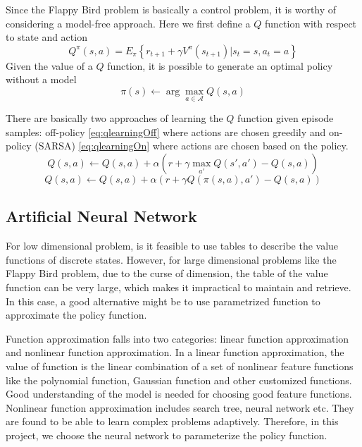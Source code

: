 \documentclass[conference,compsoc]{IEEEtran}
\begin{document}
Since the Flappy Bird problem is basically a control problem, it is worthy of considering a model-free approach. Here we first define a $Q$ function with respect to state and action 
\begin{equation}
Q^{\pi} (s,a) = E_{\pi} \left\{ r_{t+1} +\gamma V^{\pi}(s_{t+1}) | s_t =s, a_t=a\right\}
\end{equation}
Given the value of a $Q$ function, it is possible to generate an optimal policy without a model
\begin{equation}
\pi(s) \leftarrow \arg \max_{a\in \mathcal{A}} Q(s,a)
\end{equation}

There are basically two approaches of learning the $Q$ function given episode samples: off-policy \eqref{eq:qlearningOff} where actions are chosen greedily and on-policy (SARSA) \eqref{eq:qlearningOn} where actions are chosen based on the policy.
\begin{equation}\label{eq:qlearningOff}
Q(s,a) \leftarrow Q(s,a) + \alpha \left(r+\gamma \max_{a'} Q(s',a')-Q(s,a) \right)
\end{equation}
\begin{equation}\label{eq:qlearningOn}
Q(s,a) \leftarrow Q(s,a) + \alpha \left(r+\gamma Q(\pi(s,a),a')-Q(s,a) \right)
\end{equation}

\subsection{Artificial Neural Network}
For low dimensional problem, is it feasible to use tables to describe the value functions of discrete states. However, for large dimensional problems like the Flappy Bird problem, due to the curse of dimension, the table of the value function can be very large, which makes it impractical to maintain and retrieve. In this case, a good alternative might be to use parametrized function to approximate the policy function. 

Function approximation falls into two categories: linear function approximation and nonlinear function approximation. In a linear function approximation, the value of function is the linear combination of a set of nonlinear feature functions like the polynomial function, Gaussian function and other customized functions. Good understanding of the model is needed for choosing good feature functions. Nonlinear function approximation includes search tree, neural network etc. They are found to be able to learn complex problems adaptively. Therefore, in this project, we choose the neural network to parameterize the policy function. 
\end{document}
